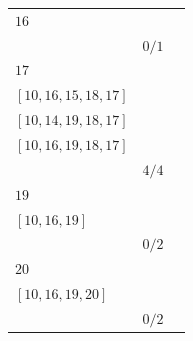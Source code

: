 \documentclass[12pt, a4paper]{extarticle}
\begin{document}
\begin{table}[h!]
\begin{tabularx}{\textwidth}{|X|X|X|}
        \hline
        $16$ & \begin{tabular}{@{}l@{}} $[10, 16]$ \\ \end{tabular} & $0/1$ \\
        \hline
        $17$ & \begin{tabular}{@{}l@{}} $[10, 14, 15, 18, 17]$ \\  $[10, 16, 15, 18, 17]$ \\  $[10, 14, 19, 18, 17]$ \\  $[10, 16, 19, 18, 17]$ \\ \end{tabular} & $4/4$ \\
        \hline
        $19$ & \begin{tabular}{@{}l@{}} $[10, 14, 19]$ \\  $[10, 16, 19]$ \\ \end{tabular} & $0/2$ \\
        \hline
        $20$ & \begin{tabular}{@{}l@{}} $[10, 14, 19, 20]$ \\  $[10, 16, 19, 20]$ \\ \end{tabular} & $0/2$ \\
        \hline
    \end{tabularx}
\end{table}
\end{document}
